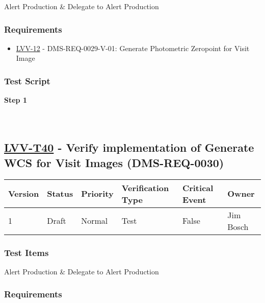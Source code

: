 Alert Production \& Delegate to Alert Production

\hypertarget{requirements-129}{%
\subsubsection{Requirements}\label{requirements-129}}

\begin{itemize}
\tightlist
\item
  \href{https://jira.lsstcorp.org/browse/LVV-12}{LVV-12} -
  DMS-REQ-0029-V-01: Generate Photometric Zeropoint for Visit Image
\end{itemize}

\hypertarget{test-script-129}{%
\subsubsection{Test Script}\label{test-script-129}}

\textbf{Step 1}\\
~\\
~\\

\hypertarget{lvv-t40---verify-implementation-of-generate-wcs-for-visit-images-dms-req-0030}{%
\subsection{\texorpdfstring{\href{https://jira.lsstcorp.org/secure/Tests.jspa\#/testCase/LVV-T40}{LVV-T40}
- Verify implementation of Generate WCS for Visit Images
(DMS-REQ-0030)}{LVV-T40 - Verify implementation of Generate WCS for Visit Images (DMS-REQ-0030)}}\label{lvv-t40---verify-implementation-of-generate-wcs-for-visit-images-dms-req-0030}}

\begin{longtable}[]{@{}llllll@{}}
\toprule
Version & Status & Priority & Verification Type & Critical Event &
Owner\tabularnewline
\midrule
\endhead
1 & Draft & Normal & Test & False & Jim Bosch\tabularnewline
\bottomrule
\end{longtable}

\hypertarget{test-items-129}{%
\subsubsection{Test Items}\label{test-items-129}}

Alert Production \& Delegate to Alert Production

\hypertarget{requirements-130}{%
\subsubsection{Requirements}\label{requirements-130}}

